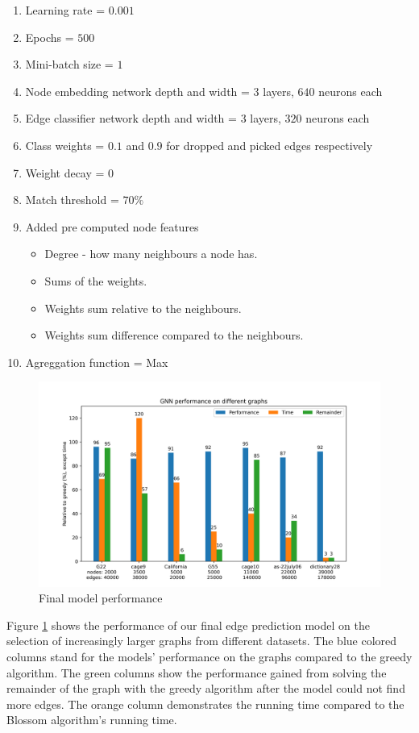 \begin{enumerate}
\item Learning rate = $0.001$
\item Epochs = $500$
\item Mini-batch size = $1$
\item Node embedding network depth and width = $3$ layers, $640$ neurons each
\item Edge classifier network depth and width = $3$ layers, $320$ neurons each
\item Class weights = $0.1$ and $0.9$ for dropped and picked edges respectively
\item Weight decay = $0$
\item Match threshold = $70\%$
\item Added pre computed node features
	\begin{itemize}
	\item Degree - how many neighbours a node has.
	\item Sums of the weights. 	
	\item Weights sum relative to the neighbours.
	\item Weights sum difference compared to the neighbours.
	\end{itemize}
\item Agreggation function = Max
\end{enumerate}

\begin{figure}[H]
    \centering
    \hspace*{-2cm}
    \includegraphics[scale=0.8]{figures/FINALResults}
    \caption{Final model performance}
    \label{Final model performance}
\end{figure}

Figure \ref{Final model performance} shows the performance of our final edge prediction model on the selection of increasingly larger graphs from different datasets. The blue colored columns stand for the models' performance on the graphs compared to the greedy algorithm. The green columns show the performance gained from solving the remainder of the graph with the greedy algorithm after the model could not find more edges. The orange column demonstrates the running time compared to the Blossom algorithm's running time.

